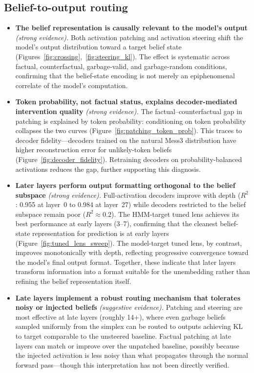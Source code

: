 \documentclass[midterm]{sparreport}
\begin{document}
\subsection{Belief-to-output routing}

\begin{itemize}
  \item \textbf{The belief representation is causally relevant to the model's output} \emph{(strong evidence).}
  Both activation patching and activation steering shift the model's output distribution toward a target belief state (Figures~\ref{fig:crossing},~\ref{fig:steering_kl}). The effect is systematic across factual, counterfactual, garbage-valid, and garbage-random conditions, confirming that the belief-state encoding is not merely an epiphenomenal correlate of the model's computation.

  \item \textbf{Token probability, not factual status, explains decoder-mediated intervention quality} \emph{(strong evidence).}
  The factual--counterfactual gap in patching is explained by token probability: conditioning on token probability collapses the two curves (Figure~\ref{fig:patching_token_prob}). This traces to decoder fidelity---decoders trained on the natural Mess3 distribution have higher reconstruction error for unlikely-token beliefs (Figure~\ref{fig:decoder_fidelity}). Retraining decoders on probability-balanced activations reduces the gap, further supporting this diagnosis.

  \item \textbf{Later layers perform output formatting orthogonal to the belief subspace} \emph{(strong evidence).}
  Full-activation decoders improve with depth ($R^2$: 0.955 at layer~0 to 0.984 at layer~27) while decoders restricted to the belief subspace remain poor ($R^2 \approx 0.2$). The HMM-target tuned lens achieves its best performance at early layers (3--7), confirming that the cleanest belief-state representation for prediction is at early layers (Figure~\ref{fig:tuned_lens_sweep}). The model-target tuned lens, by contrast, improves monotonically with depth, reflecting progressive convergence toward the model's final output format. Together, these indicate that later layers transform information into a format suitable for the unembedding rather than refining the belief representation itself.

  \item \textbf{Late layers implement a robust routing mechanism that tolerates noisy or injected beliefs} \emph{(suggestive evidence).}
  Patching and steering are most effective at late layers (roughly 14+), where even garbage beliefs sampled uniformly from the simplex can be routed to outputs achieving KL to target comparable to the unsteered baseline. Factual patching at late layers can match or improve over the unpatched baseline, possibly because the injected activation is less noisy than what propagates through the normal forward pass---though this interpretation has not been directly verified.
\end{itemize}
\end{document}
